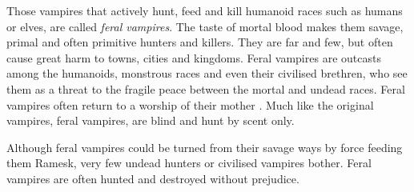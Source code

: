 Those vampires that actively hunt, feed and kill humanoid races such as
humans or elves, are called \emph{feral vampires}. The taste of mortal blood
makes them savage, primal and often primitive hunters and killers. They are
far and few, but often cause great harm to towns, cities and kingdoms. Feral
vampires are outcasts among the humanoids, monstrous races and even their
civilised brethren, who see them as a threat to the fragile peace between the
mortal and undead races. Feral vampires often return to a worship of their
mother . Much like the original vampires, feral vampires,
are blind and hunt by scent only.

Although feral vampires could be turned from their savage ways by force
feeding them Ramesk, very few undead hunters or civilised vampires
bother. Feral vampires are often hunted and destroyed without prejudice.

